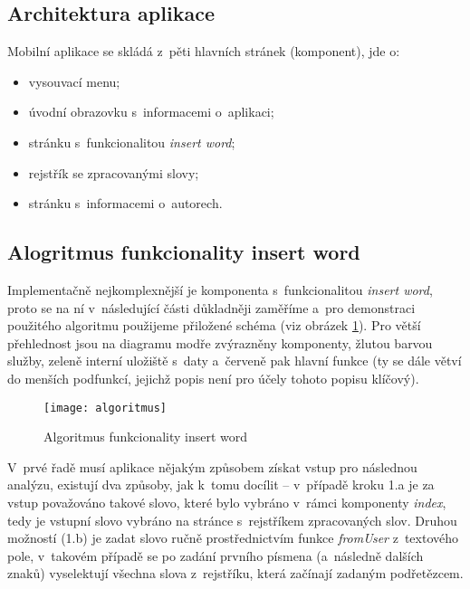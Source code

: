 \hypertarget{architektura}{%
\subsection*{Architektura aplikace}\label{architektura}}

Mobilní aplikace se skládá z~pěti hlavních stránek (komponent), jde o:

\begin{itemize}
\tightlist
\item
  vysouvací menu;
\item
  úvodní obrazovku s~informacemi o~aplikaci;
\item
  stránku s~funkcionalitou \emph{insert word};
\item
  rejstřík se zpracovanými slovy;
\item
  stránku s~informacemi o~autorech.
\end{itemize}

\hypertarget{insert word}{%
\subsection*{Alogritmus funkcionality insert word}\label{insert word}}

Implementačně nejkomplexnější je komponenta s~funkcionalitou
\emph{insert word}, proto se na ní v~následující části důkladněji
zaměříme a~pro demonstraci použitého algoritmu použijeme přiložené
schéma (viz obrázek \ref{algoritmus}). Pro větší přehlednost jsou na
diagramu modře zvýrazněny komponenty, žlutou barvou služby, zeleně
interní uložiště s~daty a~červeně pak hlavní funkce (ty se dále větví do
menších podfunkcí, jejichž popis není pro účely tohoto popisu klíčový).

\begin{figure}[ht]   
    \centering
    \texttt{[image: algoritmus]}  
    \caption{Algoritmus funkcionality insert word}
    \label{algoritmus}
 \end{figure}

V~prvé řadě musí aplikace nějakým způsobem získat vstup pro následnou
analýzu, existují dva způsoby, jak k~tomu docílit -- v~případě kroku 1.a
je za vstup považováno takové slovo, které bylo vybráno v~rámci
komponenty \emph{index}, tedy je vstupní slovo vybráno na stránce
s~rejstříkem zpracovaných slov. Druhou možností (1.b) je zadat slovo ručně
prostřednictvím funkce \emph{fromUser} z~textového pole, v~takovém
případě se po zadání prvního písmena (a~následně dalších znaků)
vyselektují všechna slova z~rejstříku, která začínají zadaným
podřetězcem.


